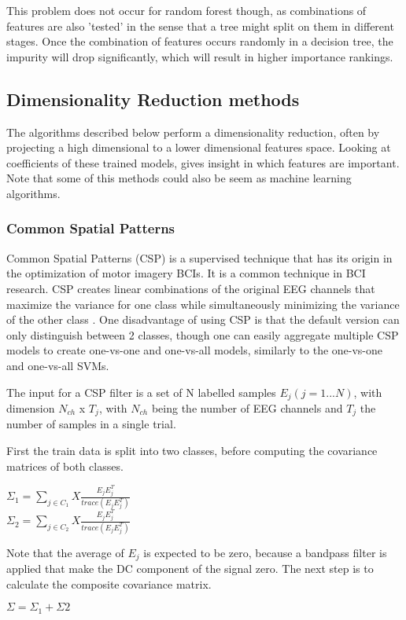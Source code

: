 \npar

This problem does not occur for random forest though, as combinations of features are also 'tested' in the sense that a tree might split on them in different stages. Once the combination of features occurs randomly in a decision tree, the impurity will drop significantly, which will result in higher importance rankings.

\subsection{Dimensionality Reduction methods}
The algorithms described below perform a dimensionality reduction, often by projecting a high dimensional to a lower dimensional features space. Looking at coefficients of these trained models, gives insight in which features are important. Note that some of this methods could also be seem as machine learning algorithms. 

\subsubsection{Common Spatial Patterns}
Common Spatial Patterns (CSP) is a supervised technique that has its origin in the optimization of motor imagery BCIs\citep{CSPSeba}. It is a common technique in BCI research\cite{ErrorPotentials,svmldacomp,currTrends}. CSP creates linear combinations of the original EEG channels that maximize the variance for one class while simultaneously minimizing the variance of the other class \cite{ErrorPotentials}. One disadvantage of using CSP is that the default version can only distinguish between 2 classes, though one can easily aggregate multiple CSP models to create one-vs-one and one-vs-all models, similarly to the one-vs-one and one-vs-all SVMs.

\npar

The input for a CSP filter is a set of N labelled samples $E_j (j=1...N)$, with dimension $N_{ch}$ x $T_j$, with $N_{ch}$ being the number of EEG channels and $T_j$ the number of samples in a single trial\citep{CSPSeba}.

\npar

First the train data is split into two classes, before computing the covariance matrices of both classes.
\begin{center}
$\Sigma_1 = {\displaystyle \sum_{j \in C_1}} X\frac{E_jE_j^T}{trace(E_jE_j^T)}$ \\
$\Sigma_2 = {\displaystyle \sum_{j \in C_2}} X\frac{E_jE_j^T}{trace(E_jE_j^T)}$ \\
\end{center}
Note that the average of $E_j$ is expected to be zero, because a bandpass filter is applied that make the DC component of the signal zero. The next step is to calculate the composite covariance matrix.
\begin{center}
$\Sigma = \Sigma_1 + \Sigma2$
\end{center}

